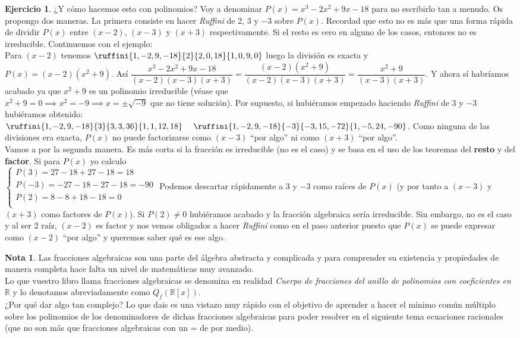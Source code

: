 \documentclass[11pt, oneside]{book}
\theoremstyle{definition} %
\newtheorem{ejercicio}{Ejercicio}
\newtheorem*{nota}{Nota}
\newcommand{\tripleleft}[3]{ \left\{ \begin{array}{ll} #1 \\#2 \\#3\\ \end{array} \right. }
\begin{document}
\begin{ejercicio}
¿Y cómo hacemos esto con polinomios? Voy a denominar $P(x)=x^3-2x^2+9x-18$ para no escribirlo tan a menudo. Os propongo dos maneras. La primera consiste en hacer \textit{Ruffini} de 2, 3 y $-3$ sobre $P(x)$. Recordad que esto no es más que una forma rápida de dividir $P(x)$ entre $(x-2)$, $(x-3)$ y $(x+3)$ respectivamente. Si el resto es cero en alguno de los casos, entonces no es irreducible. Continuemos con el ejemplo:\\

Para $(x-2)$ tenemos $\ruffini{1,-2,9,-18}{2}{2,0,18}{1,0,9,0}$ luego la división es exacta y\\ $P(x)=(x-2)(x^2+9)$. Así $\dfrac{x^3-2x^2+9x-18}{(x-2)(x-3)(x+3)}=\dfrac{(x-2)(x^2+9)}{(x-2)(x-3)(x+3)}=\dfrac{x^2+9}{(x-3)(x+3)}$. Y ahora sí habríamos acabado ya que $x^2+9$ es un polinomio irreducible (véase que\\ $x^2+9=0\implies x^2=-9\implies x=\pm\sqrt{-9}$ que no tiene solución). Por supuesto, si hubiéramos empezado haciendo \textit{Ruffini} de $3$ y $-3$ hubiéramos obtenido:\\
$\ruffini{1,-2,9,-18}{3}{3,3,36}{1,1,12,18}\ \ \ \ \ruffini{1,-2,9,-18}{-3}{-3,15,-72}{1,-5,24,-90}$. Como ninguna de las divisiones era exacta, $P(x)$ no puede factorizarse como $(x-3)$ ``por algo'' ni como $(x+3)$ ``por algo''.\\

Vamos a por la segunda manera. Es más corta si la fracción es irreducible (no es el caso) y se basa en el uso de los teoremas del \textbf{resto} y del \textbf{factor}.
Si para $P(x)$ yo calculo\\ $\tripleleft{P(3)=27-18+27-18= 18}{P(-3)=-27-18-27-18= -90}{P(2)=8-8+18-18=0}$ Podemos descartar rápidamente a 3 y $-3$ como raíces de $P(x)$ (y por tanto a $(x-3)$ y $(x+3)$ como factores de $P(x)$). Si $P(2)\neq0$ hubiéramos acabado y la fracción algebraica sería irreducible. Sin embargo, no es el caso y al ser $2$ raíz, $(x-2)$ es factor y nos vemos obligados a hacer \textit{Ruffini} como en el paso anterior puesto que $P(x)$ se puede expresar como $(x-2)$ ``por algo'' y queremos saber qué es ese algo.
\end{ejercicio}

\begin{nota} Las fracciones algebraicas son una parte del álgebra abstracta y complicada y para comprender su existencia y propiedades de manera completa hace falta un nivel de matemáticas muy avanzado.\\

Lo que vuestro libro llama fracciones algebraicas se denomina en realidad \textit{Cuerpo de fracciones del anillo de polinomios con coeficientes en $\mathbb{R}$} y lo denotamos abreviadamente como $Q_f(\mathbb{R}[x])$.\\

¿Por qué dar algo tan complejo? Lo que dais es una vistazo muy rápido con el objetivo de aprender a hacer el mínimo común múltiplo sobre los polinomios de los denominadores de dichas fracciones algebraicas para poder resolver en el siguiente tema ecuaciones racionales (que no son más que fracciones algebraicas con un = de por medio).

\end{nota}
\end{document}
